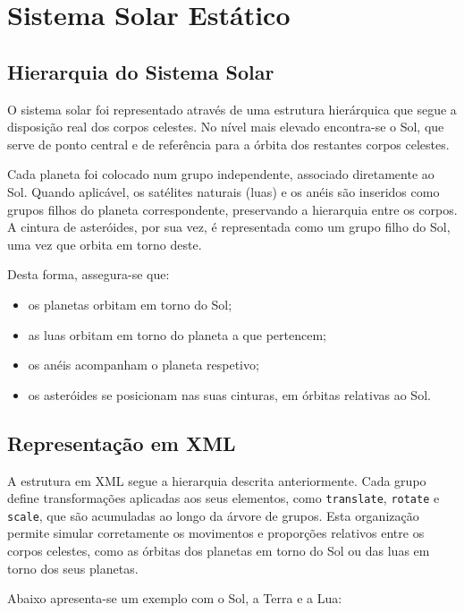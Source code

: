 \documentclass[12pt, a4paper]{article}
\begin{document}
\section{Sistema Solar Estático}

\subsection{Hierarquia do Sistema Solar}

O sistema solar foi representado através de uma estrutura hierárquica que segue a disposição
real
dos corpos celestes. No nível mais elevado encontra-se o Sol, que serve de ponto central e de
referência para a órbita dos restantes corpos celestes.

Cada planeta foi colocado num grupo independente, associado diretamente ao Sol. Quando aplicável,
os satélites naturais (luas) e os anéis são inseridos como grupos filhos do planeta
correspondente, preservando a hierarquia entre os corpos. A cintura de asteróides, por sua vez,
é representada como um grupo filho do Sol, uma vez que orbita em torno deste.

Desta forma, assegura-se que:
\begin{itemize}
    \item os planetas orbitam em torno do Sol;
    \item as luas orbitam em torno do planeta a que pertencem;
    \item os anéis acompanham o planeta respetivo;
    \item os asteróides se posicionam nas suas cinturas, em órbitas relativas ao Sol.
\end{itemize}

\subsection{Representação em XML}

A estrutura em XML segue a hierarquia descrita anteriormente. Cada grupo define transformações
aplicadas aos seus elementos, como \texttt{translate}, \texttt{rotate} e \texttt{scale}, que são
acumuladas ao longo da árvore de grupos. Esta organização permite simular corretamente os
movimentos
e proporções relativos entre os corpos celestes, como as órbitas dos planetas em torno do Sol
ou
das luas em torno dos seus planetas.

Abaixo apresenta-se um exemplo com o Sol, a Terra e a Lua:
\end{document}
